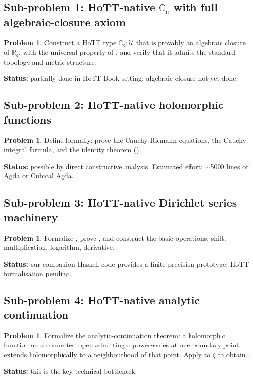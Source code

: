 \documentclass[12pt]{article}
\theoremstyle{definition}
\newtheorem{problem}[theorem]{Problem}
\theoremstyle{remark}
\newcommand{\C}{\mathbb{C}}
\newcommand{\R}{\mathbb{R}}
\newcommand{\Cc}{\C_{\mathsf{c}}}
\newcommand{\Rc}{\R_{\mathsf{c}}}
\begin{document}
\subsection*{Sub-problem 1: HoTT-native \texorpdfstring{$\Cc$}{Cc} with full algebraic-closure axiom}
\begin{problem}\label{prob:1}
Construct a HoTT type $\Cc:\mathcal{U}$ that is provably an algebraic closure
of $\Rc$, with the universal property of , and verify that
it admits the standard topology and metric structure.
\end{problem}
\textbf{Status:} partially done in HoTT Book setting; algebraic closure not
yet done.

\subsection*{Sub-problem 2: HoTT-native holomorphic functions}
\begin{problem}\label{prob:2}
Define  formally; prove the Cauchy-Riemann equations, the
Cauchy integral formula, and the identity theorem ().
\end{problem}
\textbf{Status:} possible by direct constructive analysis. Estimated effort:
$\sim$5000 lines of Agda or Cubical Agda.

\subsection*{Sub-problem 3: HoTT-native Dirichlet series machinery}
\begin{problem}\label{prob:3}
Formalize , prove , and
construct the basic operations: shift, multiplication, logarithm, derivative.
\end{problem}
\textbf{Status:} our companion Haskell code provides a finite-precision
prototype; HoTT formalisation pending.

\subsection*{Sub-problem 4: HoTT-native analytic continuation}
\begin{problem}\label{prob:4}
Formalize the analytic-continuation theorem: a holomorphic function on a
connected open admitting a power-series at one boundary point extends
holomorphically to a neighbourhood of that point. Apply to $\zeta$ to obtain
.
\end{problem}
\textbf{Status:} this is the key technical bottleneck.
\end{document}
